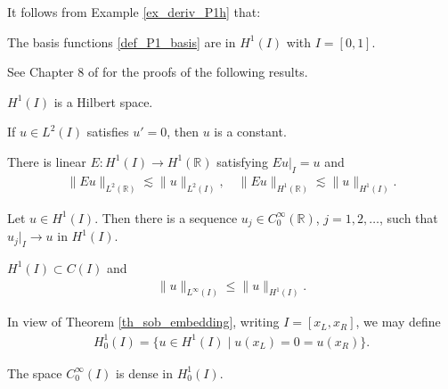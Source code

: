 \documentclass[12pt,oneside]{amsart}
\def\R{\mathbb R}
\begin{document}
It follows from Example \ref{ex_deriv_P1h} that: 

\begin{example}\label{ex_P1_basis}
The basis functions \eqref{def_P1_basis} are in $H^1(I)$ with $I = [0,1]$.
\end{example}

See Chapter 8 of \cite{Brezis} for the proofs of the following results.

\begin{theorem}
$H^1(I)$ is a Hilbert space.
\end{theorem}

\begin{lemma}
If $u \in L^2(I)$ satisfies $u' = 0$, then $u$ is a constant. 
\end{lemma}

\begin{theorem}[Extension, Th. 8.6]
There is linear $E : H^1(I) \to H^1(\R)$
satisfying $E u|_{I} = u$ and
    \begin{align*}
\|E u\|_{L^2(\R)} \lesssim \|u\|_{L^2(I)},
\quad 
\|E u\|_{H^1(\R)} \lesssim \|u\|_{H^1(I)}.
    \end{align*}
\end{theorem}

\begin{theorem}[Density in $H^1$, Th. 8.7]\label{th_density_H1}
Let $u \in H^1(I)$. Then there is a sequence $u_j \in C_0^\infty(\R)$, $j=1,2,\dots$, such that $u_j|_{I} \to u$ in $H^1(I)$.
\end{theorem}

\begin{theorem}\label{th_sob_embedding}
$H^1(I) \subset C(I)$ and 
    \begin{align*}
\|u\|_{L^\infty(I)} \le \|u\|_{H^1(I)}.
    \end{align*}
\end{theorem}

In view of Theorem \ref{th_sob_embedding}, writing $I=[x_L, x_R]$, we may define
    \begin{align*}
H_0^1(I) = \{u \in H^1(I) \mid u(x_L) = 0 = u(x_R) \}.
    \end{align*}

\begin{theorem}[Density in $H^1_0$, Th. 8.12]\label{th_density_H01}
The space $C_0^\infty(I)$ is dense in $H^1_0(I)$.
\end{theorem}
\end{document}
